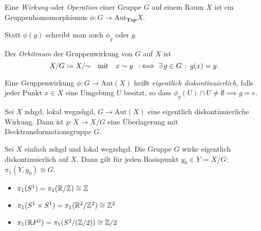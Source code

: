 \documentclass{cheat-sheet}
\newcommand{\Aut}{\mathrm{Aut}} %
\begin{document}
\begin{defn}
  Eine \emph{Wirkung} oder \emph{Operation} einer Gruppe $G$ auf einem Raum $X$ ist ein Gruppenhomomorphismus $\phi : G \to \Aut_{\mathbf{Top}}{X}$.
\end{defn}

\begin{nota}
  Statt $\phi(g)$ schreibt man auch $\phi_g$ oder $g$.
\end{nota}

\begin{defn}
  Der \emph{Orbitraum} der Gruppenwirkung von $G$ auf $X$ ist
  \[
    X / G \coloneqq X / {\sim}
    \quad \text{mit} \quad
    x \sim y \enspace:\!\iff \exists \, {g \in G} \,:\, g(x) = y.
  \]
\end{defn}


\begin{defn}
  Eine Gruppenwirkung $\phi : G \to \Aut(X)$ heißt \emph{eigentlich diskontinuierlich}, falls jeder Punkt $x \in X$ eine Umgebung $U$ besitzt, so dass $\phi_g(U) \cap U \not= \emptyset \implies g = e$.
\end{defn}

\begin{prop}
  Sei $X$ zshgd, lokal wegzshgd, $G \to \Aut(X)$ eine eigentlich diskontinuierliche Wirkung. Dann ist $p : X \to X/G$ eine Überlagerung mit Decktransformationsgruppe $G$.
\end{prop}

\begin{satz}
  Sei $X$ einfach zshgd und lokal wegzshgd. Die Gruppe $G$ wirke eigentlich diskontinuierlich auf $X$. Dann gilt für jeden Basispunkt $y_0 \in Y \coloneqq X / G$: $\pi_1(Y, y_0) \cong G$.
\end{satz}

\begin{bspe}
  \begin{itemize}
    \item $\pi_1(S^1) = \pi_1(\mathbb{R} / \mathbb{Z}) \cong \mathbb{Z}$
    \item $\pi_1(S^1 \times S^1) = \pi_1(\mathbb{R}^2 / \mathbb{Z}^2) \cong \mathbb{Z}^2$
    \item $\pi_1(\mathbb{R} P^2) = \pi_1(S^2 / (\mathbb{Z}/2)) \cong \mathbb{Z}/2$
  \end{itemize}
\end{bspe}
\end{document}
